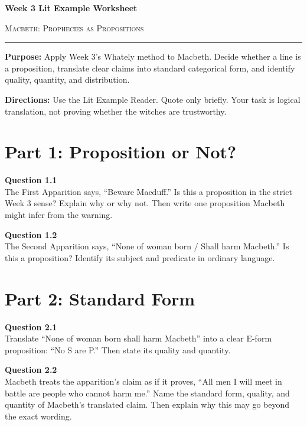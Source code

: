 \documentclass[12pt]{article}
\begin{document}
\begin{center}
{\LARGE\bfseries Week 3 Lit Example Worksheet}\par\vspace{0.05em}
{\large\scshape Macbeth: Prophecies as Propositions}\par\vspace{0.12em}
\rule{0.78\textwidth}{0.5pt}
\end{center}

\textbf{Purpose:} Apply Week 3's Whately method to Macbeth. Decide whether a line is a proposition, translate clear claims into standard categorical form, and identify quality, quantity, and distribution.

\textbf{Directions:} Use the Lit Example Reader. Quote only briefly. Your task is logical translation, not proving whether the witches are trustworthy.

\section*{Part 1: Proposition or Not?}

\textbf{Question 1.1}\\[-0.15em]
The First Apparition says, ``Beware Macduff.'' Is this a proposition in the strict Week 3 sense? Explain why or why not. Then write one proposition Macbeth might infer from the warning.


\textbf{Question 1.2}\\[-0.15em]
The Second Apparition says, ``None of woman born / Shall harm Macbeth.'' Is this a proposition? Identify its subject and predicate in ordinary language.


\newpage

\section*{Part 2: Standard Form}

\textbf{Question 2.1}\\[-0.15em]
Translate ``None of woman born shall harm Macbeth'' into a clear E-form proposition: ``No S are P.'' Then state its quality and quantity.


\textbf{Question 2.2}\\[-0.15em]
Macbeth treats the apparition's claim as if it proves, ``All men I will meet in battle are people who cannot harm me.'' Name the standard form, quality, and quantity of Macbeth's translated claim. Then explain why this may go beyond the exact wording.
\end{document}
